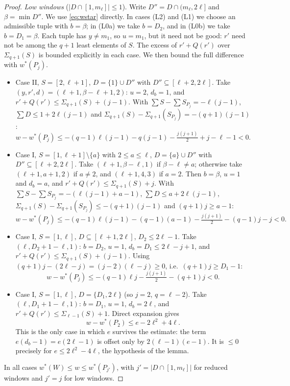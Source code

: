 \documentclass[11pt]{amsart}
\theoremstyle{definition}
\begin{document}
\begin{proof}
\emph{Low windows} ($|D\cap[1,m_\ell]|\le1$). Write $D''=D\cap(m_\ell,2\ell]$ and $\beta=\min D''$. We use \eqref{eq:wstar} directly. In cases (L2) and (L1) we choose an admissible tuple with $b=\beta$; in (L0a) we take $b=D_2$, and in (L0b) we take $b=D_1=\beta$. Each tuple has $y\ne m_1$, so $u=m_1$, but it need not be good: $r'$ need not be among the $q+1$ least elements of $S$. The excess of $r'+Q(r')$ over $\Sigma_{q+1}(S)$ is bounded explicitly in each case. We then bound the full difference with $w^*(P_j)$.
\begin{itemize}
\item[(L2)] Case II, $S=[2,\ell+1]$, $D=\{1\}\cup D''$ with $D''\subseteq[\ell+2,2\ell]$. Take $(y,r',d)=(\ell+1,\beta-\ell+1,2)$: $u=2$, $d_b=1$, and $r'+Q(r')\le\Sigma_{q+1}(S)+(j-1)$. With $\sum S-\sum S_{P_j}=-\ell(j-1)$, $\sum D\le1+2\ell(j-1)$ and $\Sigma_{q+1}(S)-\Sigma_{q+1}(S_{P_j})=-(q+1)(j-1)$:
\[ w-w^*(P_j)\le-(q-1)\ell(j-1)-q(j-1)-\tfrac{j(j+1)}2+j-\ell-1<0. \]
\item[(L1)] Case I, $S=[1,\ell+1]\setminus\{a\}$ with $2\le a\le\ell$, $D=\{a\}\cup D''$ with $D''\subseteq[\ell+2,2\ell]$. Take $(\ell+1,\beta-\ell,1)$ if $\beta-\ell\ne a$; otherwise take $(\ell+1,a+1,2)$ if $a\ne2$, and $(\ell+1,4,3)$ if $a=2$. Then $b=\beta$, $u=1$ and $d_b=a$, and $r'+Q(r')\le\Sigma_{q+1}(S)+j$. With $\sum S-\sum S_{P_j}=-(\ell(j-1)+a-1)$, $\sum D\le a+2\ell(j-1)$, $\Sigma_{q+1}(S)-\Sigma_{q+1}(S_{P_j})\le-(q+1)(j-1)$ and $(q+1)j\ge a-1$:
\[ w-w^*(P_j)\le-(q-1)\ell(j-1)-(q-1)(a-1)-\tfrac{j(j+1)}2-(q-1)j-j<0. \]
\item[(L0a)] Case I, $S=[1,\ell]$, $D\subseteq[\ell+1,2\ell]$, $D_2\le2\ell-1$. Take $(\ell,D_2+1-\ell,1)$: $b=D_2$, $u=1$, $d_b=D_1\le2\ell-j+1$, and $r'+Q(r')\le\Sigma_{q+1}(S)+(j-1)$. Using $(q+1)j-(2\ell-j)=(j-2)(\ell-j)\ge0$, i.e.\ $(q+1)j\ge D_1-1$:
\[ w-w^*(P_j)\le-(q-1)\ell j-\tfrac{j(j+1)}2-(q+1)j<0. \]
\item[(L0b)] Case I, $S=[1,\ell]$, $D=\{D_1,2\ell\}$ (so $j=2$, $q=\ell-2$). Take $(\ell,D_1+1-\ell,1)$: $b=D_1$, $u=1$, $d_b=2\ell$, and $r'+Q(r')\le\Sigma_{\ell-1}(S)+1$. Direct expansion gives
\[ w-w^*(P_2)\le e-2\ell^2+4\ell. \]
This is the only case in which $e$ survives the estimate: the term $e(d_b-1)=e(2\ell-1)$ is offset only by $2(\ell-1)(e-1)$. It is $\le0$ precisely for $e\le2\ell^2-4\ell$, the hypothesis of the lemma.
\end{itemize}
In all cases $w^*(W)\le w\le w^*(P_{j'})$, with $j'=|D\cap[1,m_\ell]|$ for reduced windows and $j'=j$ for low windows.
\end{proof}
\end{document}
